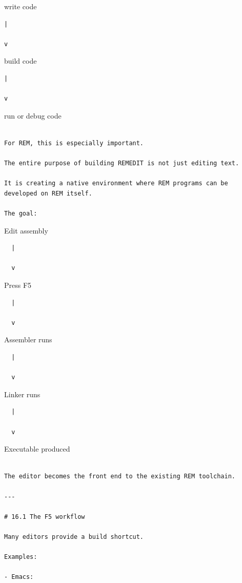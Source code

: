 \documentclass[
  oneside,
  openany]{book}
\begin{document}
write code

\begin{verbatim}
|

v
\end{verbatim}

build code

\begin{verbatim}
|

v
\end{verbatim}

run or debug code

\begin{verbatim}

For REM, this is especially important.

The entire purpose of building REMEDIT is not just editing text.

It is creating a native environment where REM programs can be developed on REM itself.

The goal:
\end{verbatim}

Edit assembly

\begin{verbatim}
  |

  v
\end{verbatim}

Press F5

\begin{verbatim}
  |

  v
\end{verbatim}

Assembler runs

\begin{verbatim}
  |

  v
\end{verbatim}

Linker runs

\begin{verbatim}
  |

  v
\end{verbatim}

Executable produced

\begin{verbatim}

The editor becomes the front end to the existing REM toolchain.

---

# 16.1 The F5 workflow

Many editors provide a build shortcut.

Examples:

- Emacs:
\end{verbatim}
\end{document}
